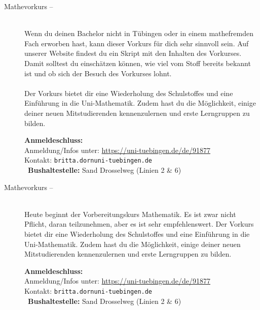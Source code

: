 \begin{description}
\ifmaster
	\ifml %
	\else
		\ifkogwiss %
		\else
			\item[Mathevorkurs -- \mathedatum~\YEAR]~\\
			Wenn du deinen Bachelor nicht in Tübingen oder in einem mathefremden Fach erworben hast, kann dieser Vorkurs für dich sehr sinnvoll sein. Auf unserer Website findest du ein Skript mit den Inhalten des Vorkurses. Damit solltest du einschätzen können, wie viel vom Stoff bereits bekannt ist und ob sich der Besuch des Vorkurses lohnt.\\\\
			Der Vorkurs bietet dir eine Wiederholung des Schulstoffes und eine Einführung in die Uni-Mathematik. Zudem hast du die Möglichkeit, einige deiner neuen Mitstudierenden kennenzulernen und erste Lerngruppen zu bilden.

			\textbf{Anmeldeschluss:} \matheanmeldung\YEAR\\
			Anmeldung/Infos unter: \url{https://uni-tuebingen.de/de/91877}\\
			Kontakt: \texttt{britta.dorn\At uni-tuebingen.de}\\
			\ifsommersemester
			~\textbf{Bushaltestelle:} Sand Drosselweg (Linien 2 \& 6) 
			\fi
		\fi
	\fi
\fi

\ifbachelor
	\item[Mathevorkurs -- \mathedatum~\YEAR]~\\
	Heute beginnt der Vorbereitungskurs Mathematik. Es ist zwar nicht Pflicht, daran teilzunehmen, aber es ist sehr empfehlenswert.
	Der Vorkurs bietet dir eine Wiederholung des Schulstoffes und eine Einführung in die Uni-Mathematik. Zudem hast du die Möglichkeit, einige deiner neuen Mitstudierenden kennenzulernen und erste Lerngruppen zu bilden.

	\textbf{Anmeldeschluss:} \matheanmeldung\YEAR\\
	Anmeldung/Infos unter: \url{https://uni-tuebingen.de/de/91877}\\
	Kontakt: \texttt{britta.dorn\At uni-tuebingen.de}\\
	\ifsommersemester
	~\textbf{Bushaltestelle:} Sand Drosselweg (Linien 2 \& 6) 
	\fi
\fi




\end{description}
